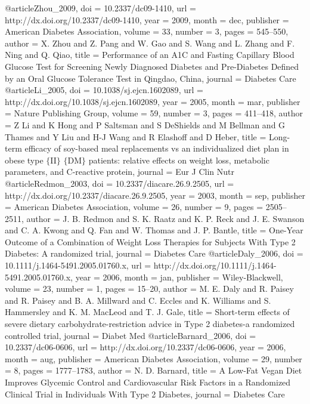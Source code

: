 @article{Zhou_2009,
	doi = {10.2337/dc09-1410},
	url = {http://dx.doi.org/10.2337/dc09-1410},
	year = 2009,
	month = {dec},
	publisher = {American Diabetes Association},
	volume = {33},
	number = {3},
	pages = {545--550},
	author = {X. Zhou and Z. Pang and W. Gao and S. Wang and L. Zhang and F. Ning and Q. Qiao},
	title = {Performance of an A1C and Fasting Capillary Blood Glucose Test for Screening Newly Diagnosed Diabetes and Pre-Diabetes Defined by an Oral Glucose Tolerance Test in Qingdao, China},
	journal = {Diabetes Care}
}
@article{Li_2005,
	doi = {10.1038/sj.ejcn.1602089},
	url = {http://dx.doi.org/10.1038/sj.ejcn.1602089},
	year = 2005,
	month = {mar},
	publisher = {Nature Publishing Group},
	volume = {59},
	number = {3},
	pages = {411--418},
	author = {Z Li and K Hong and P Saltsman and S DeShields and M Bellman and G Thames and Y Liu and H-J Wang and R Elashoff and D Heber},
	title = {Long-term efficacy of soy-based meal replacements vs an individualized diet plan in obese type $\lbrace$II$\rbrace$ $\lbrace$DM$\rbrace$ patients: relative effects on weight loss, metabolic parameters, and C-reactive protein},
	journal = {Eur J Clin Nutr}
}
@article{Redmon_2003,
	doi = {10.2337/diacare.26.9.2505},
	url = {http://dx.doi.org/10.2337/diacare.26.9.2505},
	year = 2003,
	month = {sep},
	publisher = {American Diabetes Association},
	volume = {26},
	number = {9},
	pages = {2505--2511},
	author = {J. B. Redmon and S. K. Raatz and K. P. Reck and J. E. Swanson and C. A. Kwong and Q. Fan and W. Thomas and J. P. Bantle},
	title = {One-Year Outcome of a Combination of Weight Loss Therapies for Subjects With Type 2 Diabetes: A randomized trial},
	journal = {Diabetes Care}
}
@article{Daly_2006,
	doi = {10.1111/j.1464-5491.2005.01760.x},
	url = {http://dx.doi.org/10.1111/j.1464-5491.2005.01760.x},
	year = 2006,
	month = {jan},
	publisher = {Wiley-Blackwell},
	volume = {23},
	number = {1},
	pages = {15--20},
	author = {M. E. Daly and R. Paisey and R. Paisey and B. A. Millward and C. Eccles and K. Williams and S. Hammersley and K. M. MacLeod and T. J. Gale},
	title = {Short-term effects of severe dietary carbohydrate-restriction advice in Type 2 diabetes-a randomized controlled trial},
	journal = {Diabet Med}
}
@article{Barnard_2006,
	doi = {10.2337/dc06-0606},
	url = {http://dx.doi.org/10.2337/dc06-0606},
	year = 2006,
	month = {aug},
	publisher = {American Diabetes Association},
	volume = {29},
	number = {8},
	pages = {1777--1783},
	author = {N. D. Barnard},
	title = {A Low-Fat Vegan Diet Improves Glycemic Control and Cardiovascular Risk Factors in a Randomized Clinical Trial in Individuals With Type 2 Diabetes},
	journal = {Diabetes Care}
}
